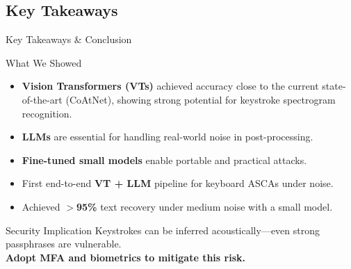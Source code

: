 \documentclass[aspectratio=169]{beamer}
\begin{document}
\subsection{Key Takeaways}
\begin{frame}{Key Takeaways \& Conclusion}
  \begin{block}{What We Showed}
    \begin{itemize}
        \item \textbf{Vision Transformers (VTs)} achieved accuracy close to the current state-of-the-art (CoAtNet), showing strong potential for keystroke spectrogram recognition.
      \item \textbf{LLMs} are essential for handling real-world noise in post-processing.
      \item \textbf{Fine-tuned small models} enable portable and practical attacks.
      \item First end-to-end \textbf{VT + LLM} pipeline for keyboard ASCAs under noise.
      \item Achieved \textbf{$>$95\%} text recovery under medium noise with a small model.
    \end{itemize}
  \end{block}
    \begin{block}{Security Implication}
      Keystrokes can be inferred acoustically—even strong passphrases are vulnerable.\\
      \textbf{Adopt MFA and biometrics to mitigate this risk.}
    \end{block}
\end{frame}

\end{document}
